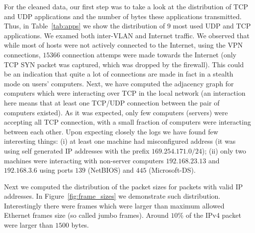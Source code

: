 For the cleaned data, our first step was to take a look at the distribution of TCP and UDP applications and the number of bytes these 
applications transmitted. Thus, in Table~\ref{tab:apps} we show the distribution of $9$ most used UDP and TCP applications. We examed 
both inter-VLAN and Internet traffic. We observed that while most of hosts were not actively connected to the Internet, using the VPN 
connections, $15366$ connection attemps were made towards the Internet (only TCP SYN packet was captured, which was dropped by the 
firewall). This could be an indication that quite a lot of connections are made in fact in a stealth mode on users' computers. Next, we 
have computed the adjacency graph for computers which were interacting over TCP in the local network (an interaction here means that at 
least one TCP/UDP connection between the pair of computers existed).  As it was expected, only few computers (servers) were accepting all TCP connection, with a small 
fraction of computers were interacting between each other. Upon expecting closely the logs we have found few interesting things: (i) at 
least one machine had misconfigured address (it was using self generated IP addresses with the prefix $169.254.171.0/24$); (ii) 
only two machines were interacting with non-server computers $192.168.23.13$ and $192.168.3.6$ using ports $139$ (NetBIOS) and $445$ 
(Microsoft-DS).

Next we computed the distribution of the packet sizes for packets with valid IP addresses. {\eat In Figure~\ref{fig:frame_sizes} 
we demonstrate such distribution. Interestingly there were frames which were larger than maximum allowed Ethernet frames 
size (so called jumbo frames).} Around $10\%$ of the IPv4 packet were larger than $1500$ bytes. 

